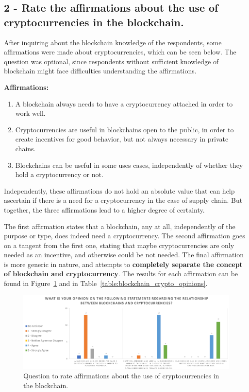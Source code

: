 \subsection*{2 - Rate the affirmations about the use of cryptocurrencies in the blockchain.}

After inquiring about the blockchain knowledge of the respondents, some affirmations were made about cryptocurrencies, which can be seen below. The question was optional, since respondents without sufficient knowledge of blockchain might face difficulties understanding the affirmations.


\textbf{Affirmations: }
\begin{enumerate}
\item A blockchain always needs to have a cryptocurrency attached in order to work well.
\item Cryptocurrencies are useful in blockchains open to the public, in order to create incentives for good behavior, but not always necessary in private chains.
\item Blockchains can be useful in some uses cases, independently of whether they hold a cryptocurrency or not.
\end{enumerate}

Independently, these affirmations do not hold an absolute value that can help ascertain if there is a need for a cryptocurrency in the case of supply chain. But together, the three affirmations lead to a higher degree of certainty.

The first affirmation states that a blockchain, any at all, independently of the purpose or type, does indeed need a cryptocurrency. The second affirmation goes on a tangent from the first one, stating that maybe cryptocurrencies are only needed as an incentive, and otherwise could be not needed. The final affirmation is more generic in nature, and attempts to \textbf{completely separate the concept of blockchain and cryptocurrency}. The results for each affirmation can be found in Figure~\ref{fig:blockchain_crypto_opinions} and in Table~\ref{table:blockchain_crypto_opinions}.

\begin{figure}[h]
\centering
\includegraphics[scale=0.95]{media/survey_group2/blockchain_crypto_opinions.pdf}
\caption{Question to rate affirmations about the use of cryptocurrencies in the blockchain.}
\label{fig:blockchain_crypto_opinions}
\end{figure}



